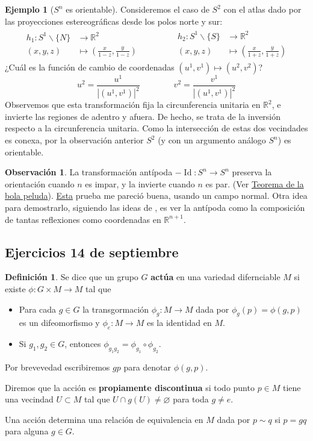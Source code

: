 \documentclass[spanish]{book}
\theoremstyle{definition}
\newtheorem*{defn}{Definición}
\newtheorem*{obs}{Observación}
\newtheorem*{ejem}{Ejemplo}
\newcommand{\R}{\mathbb{R}}
\DeclareMathOperator{\Id}{Id}
\begin{document}
	\begin{ejem}[$S^n$ es orientable]
		Consideremos el caso de $S^2$ con el atlas dado por las proyecciones estereográficas desde los polos norte y sur:
		\begin{align*}
			\begin{aligned}
				h_1:S^1\backslash\{N\}&\to\R^2\\
				(x,y,z)&\mapsto\left(\frac{x}{1-z},\frac{y}{1-z}\right)
			\end{aligned}\qquad\qquad
			\begin{aligned}
				h_2:S^1\backslash\{S\}&\to\R^2\\
				(x,y,z)&\mapsto\left(\frac{x}{1+z},\frac{y}{1+z}\right)
			\end{aligned}
		\end{align*}
		¿Cuál es la función de cambio de coordenadas $(u^1,v^1)\mapsto(u^2,v^2)$?
		\[u^2=\frac{u^1}{|(u^1,v^1)|^2}\qquad\qquad v^2=\frac{v^1}{|(u^1,v^1)|^2}\]
		Observemos que esta transformación fija la circunferencia unitaria en $\R^2$, e invierte las regiones de adentro y afuera. De hecho, se trata de la inversión respecto a la circunferencia unitaria. Como la intersección de estas dos vecindades es conexa, por la observación anterior $S^2$ (y con un argumento análogo $S^n$) es orientable.
	\end{ejem}
	\begin{obs}\label{obs:antipoda-orientacion}
		La transformación antípoda $-\Id:S^n\to S^n$ preserva la orientación cuando $n$ es impar, y la invierte cuando $n$ es par. (Ver \hyperref[teo:bola-peluda]{Teorema de la bola peluda}). \href{https://math.stackexchange.com/questions/74712/proving-rigorously-a-map-preserves-orientation}{Esta} prueba me pareció buena, usando un campo normal. Otra idea para demostrarlo, siguiendo las ideas de \cite{Hatcher}, es ver la antípoda como la composición de tantas reflexiones como coordenadas en $\R^{n+1}$.
	\end{obs}
	\subsection{Ejercicios 14 de septiembre}
	\begin{defn}
		Se dice que un grupo $G$ \textbf{actúa} en una variedad difernciable $M$ si existe $\phi:G\times M\to M$ tal que
		\begin{itemize}
			\item Para cada $g\in G$ la transgormación $\phi_g:M\to M$ dada por $\phi_g(p)=\phi(g,p)$ es un difeomorfismo y $\phi_e:M\to M$ es la identidad en $M$.
			\item Si $g_1,g_2\in G$, entonces $\phi_{g_1g_2}=\phi_{g_1}\circ\phi_{g_2}$.
		\end{itemize}
		Por brevevedad escribiremos $gp$ para denotar $\phi(g,p)$.
		
		Diremos que la acción es \textbf{propiamente discontinua} si todo punto $p\in M$ tiene una vecindad $U\subset M$ tal que $U\cap g(U)\neq\varnothing$ para toda $g\neq e$.
	\end{defn}
	Una acción determina una relación de equivalencia en $M$ dada por $p\sim q$ si $p=gq$ para alguna $g\in G$.
	
\end{document}
